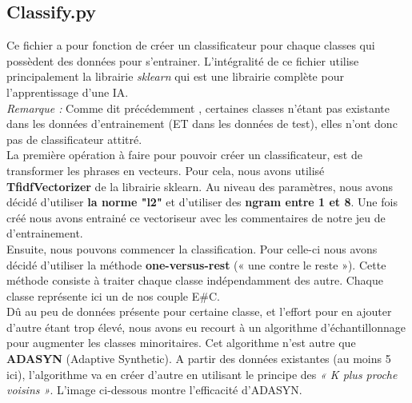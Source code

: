 \documentclass[12pt ,a4paper ]{article}
\begin{document}
\begin{multicols}{2}
\subsection{Classify.py}
Ce fichier a pour fonction de créer un classificateur pour chaque classes qui possèdent des données pour s'entrainer. L'intégralité de ce fichier utilise principalement la librairie \textit{sklearn} qui est une librairie complète pour l'apprentissage d'une IA.\\

\noindent \textit{Remarque : } 
Comme dit précédemment , certaines classes n'étant pas existante dans les données d'entrainement (ET dans les données de test), elles n'ont donc pas de classificateur attitré.\\

La première opération à faire pour pouvoir créer un classificateur, est de transformer les phrases en vecteurs. Pour cela, nous avons utilisé \textbf{TfidfVectorizer} de la librairie sklearn. Au niveau des paramètres, nous avons décidé d'utiliser\textbf{ la norme "l2"} et d'utiliser des \textbf{ngram entre 1 et 8}. Une fois créé nous avons entrainé ce vectoriseur avec les commentaires de notre jeu de d'entrainement.\\

Ensuite, nous pouvons commencer la classification. Pour celle-ci nous avons décidé d'utiliser la méthode \textbf{one-versus-rest} (« une contre le reste »). Cette méthode consiste à traiter chaque classe indépendamment des autre. Chaque classe représente ici un de nos couple E\#C.\\

Dû au peu de données présente pour certaine classe, et l'effort pour en ajouter d'autre étant trop élevé, nous avons eu recourt à un algorithme d'échantillonnage pour augmenter les classes minoritaires. Cet algorithme n'est autre que \textbf{ADASYN} (Adaptive Synthetic). A partir des données existantes (au moins 5 ici), l'algorithme va en créer d'autre en utilisant le principe des \textit{« K plus proche voisins »}. L'image ci-dessous montre l'efficacité d'ADASYN.\\


\end{multicols}
\end{document}
